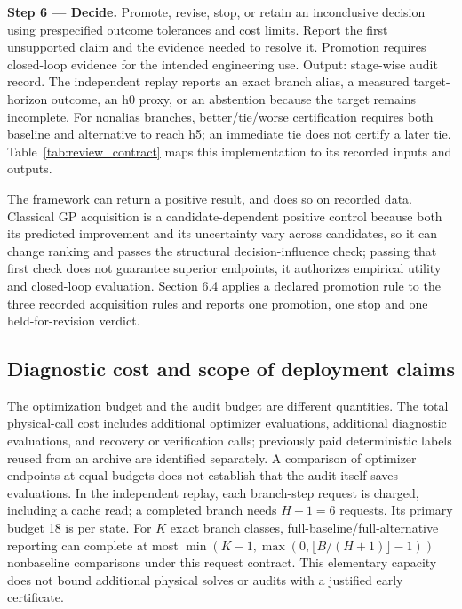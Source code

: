 \documentclass[]{interact}
\begin{document}
\textbf{Step 6 --- Decide.} Promote, revise, stop, or retain an inconclusive decision using prespecified outcome tolerances and cost limits. Report the first unsupported claim and the evidence needed to resolve it. Promotion requires closed-loop evidence for the intended engineering use. Output: stage-wise audit record. The independent replay reports an exact branch alias, a measured target-horizon outcome, an h0 proxy, or an abstention because the target remains incomplete. For nonalias branches, better/tie/worse certification requires both baseline and alternative to reach h5; an immediate tie does not certify a later tie. Table~\ref{tab:review_contract} maps this implementation to its recorded inputs and outputs.




The framework can return a positive result, and does so on recorded data. Classical GP acquisition is a candidate-dependent positive control because both its predicted improvement and its uncertainty vary across candidates, so it can change ranking and passes the structural decision-influence check; passing that first check does not guarantee superior endpoints, it authorizes empirical utility and closed-loop evaluation. Section 6.4 applies a declared promotion rule to the three recorded acquisition rules and reports one promotion, one stop and one held-for-revision verdict.

\hypertarget{diagnostic-cost-and-scope-of-deployment-claims}{%
\subsection{Diagnostic cost and scope of deployment claims}\label{diagnostic-cost-and-scope-of-deployment-claims}}

The optimization budget and the audit budget are different quantities. The total physical-call cost includes additional optimizer evaluations, additional diagnostic evaluations, and recovery or verification calls; previously paid deterministic labels reused from an archive are identified separately. A comparison of optimizer endpoints at equal budgets does not establish that the audit itself saves evaluations. In the independent replay, each branch-step request is charged, including a cache read; a completed branch needs $H+1=6$ requests. Its primary budget 18 is per state. For $K$ exact branch classes, full-baseline/full-alternative reporting can complete at most $\min(K-1,\max(0,\lfloor B/(H+1)\rfloor-1))$ nonbaseline comparisons under this request contract. This elementary capacity does not bound additional physical solves or audits with a justified early certificate.
\end{document}
